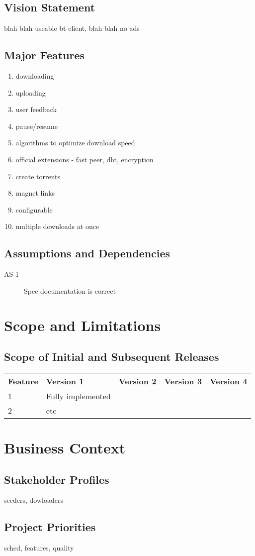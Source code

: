 \documentclass[letter]{scrartcl}
\begin{document}
\subsection{Vision Statement}
blah blah useable bt client, blah blah no ads
\subsection{Major Features}
\begin{enumerate}
\item downloading
\item uploading
\item user feedback
\item pause/resume
\item algorithms to optimize download speed
\item official extensions - fast peer, dht, encryption
\item create torrents
\item magnet links
\item configurable
\item multiple downloads at once
\end{enumerate}

\subsection{Assumptions and Dependencies}
\begin{description}
\item[AS-1] Spec documentation is correct
\end{description}

\section{Scope and Limitations}
\subsection{Scope of Initial and Subsequent Releases}
\begin{tabular}{| l | l | l | l | l |}
\hline
\textbf{Feature} & \textbf{Version 1} & \textbf{Version 2} & \textbf{Version 3} & \textbf{Version 4} \\
\hline
\hline
1 & Fully implemented & & & \\
\hline
2 & etc & & & \\
\hline
\end{tabular}



\section{Business Context}
\subsection{Stakeholder Profiles}
seeders, dowloaders

\subsection{Project Priorities}
sched, features, quality
\end{document}
